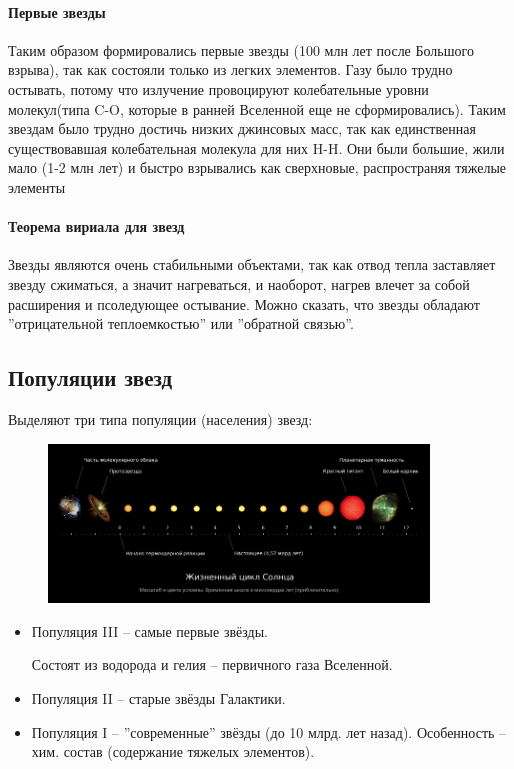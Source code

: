\paragraph{Первые звезды}

Таким образом формировались первые звезды (100 млн лет после Большого взрыва), так как состояли только из легких элементов. Газу было трудно остывать, потому что излучение провоцируют колебательные уровни молекул(типа C-O, которые в ранней Вселенной еще не сформировались). Таким звездам было трудно достичь низких джинсовых масс, так как единственная существовавшая колебательная молекула для них H-H. Они были большие, жили мало (1-2 млн лет) и быстро взрывались как сверхновые, распространяя тяжелые элементы 

\paragraph{Теорема вириала для звезд}

Звезды являются очень стабильными объектами, так как отвод тепла заставляет звезду сжиматься, а значит нагреваться, и наоборот, нагрев влечет за собой расширения и псоледующее остывание. Можно сказать, что звезды обладают ''отрицательной теплоемкостью'' или ''обратной связью''.

\newpage

\subsection{Популяции звезд}

Выделяют три типа популяции (населения) звезд:
\begin{figure}
    \centering
    \includegraphics[width = 0.9\textwidth]{Pictures/9_Solar-evolution.png}
    \label{fig:9_solar}
\end{figure}

\begin{itemize}
    \item Популяция III -- самые первые звёзды.
    
    Состоят из водорода и гелия -- первичного газа Вселенной.
    \item Популяция II -- старые звёзды Галактики.
    
    \item Популяция I -- ''современные'' звёзды (до 10 млрд. лет назад).
    Особенность -- хим. состав (содержание тяжелых элементов).
    
\end{itemize}
